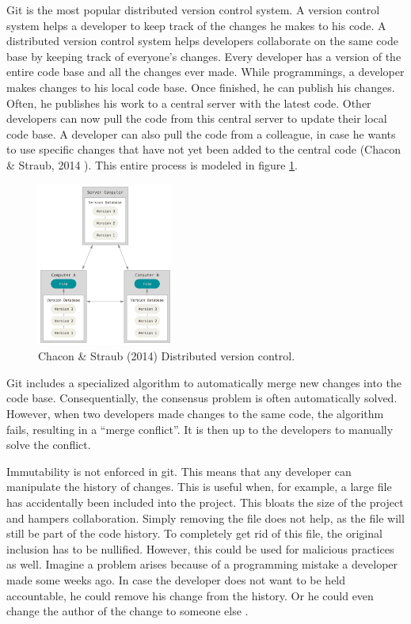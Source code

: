 Git is the most popular distributed version control system. A version control system helps a developer to keep track of the changes he makes to his code. A distributed version control system helps developers collaborate on the same code base by keeping track of everyone's changes. Every developer has a version of the entire code base and all the changes ever made. While programmings, a developer makes changes to his local code base. Once finished, he can publish his changes. Often, he publishes his work to a central server with the latest code. Other developers can now pull the code from this central server to update their local code base. A developer can also pull the code from a colleague, in case he wants to use specific changes that have not yet been added to the central code (Chacon \& Straub, 2014 \cite{git-manual-book}). This entire process is modeled in figure \ref{fig:distributed-vcs}.


\begin{figure}[h]
\centering
\includegraphics[width=0.4\textwidth]{paper-images/distributed.png}
\caption{Chacon \& Straub (2014) Distributed version control.} 
\label{fig:distributed-vcs}
\end{figure}

Git includes a specialized algorithm to automatically merge new changes into the code base. Consequentially, the consensus problem is often automatically solved. However, when two developers made changes to the same code, the algorithm fails, resulting in a ``merge conflict''. It is then up to the developers to manually solve the conflict. 

Immutability is not enforced in git. This means that any developer can manipulate the history of changes. This is useful when, for example, a large file has accidentally been included into the project. This bloats the size of the project and hampers collaboration. Simply removing the file does not help, as the file will still be part of the code history. To completely get rid of this file, the original inclusion has to be nullified. However, this could be used for malicious practices as well. Imagine a problem arises because of a programming mistake a developer made some weeks ago. In case the developer does not want to be held accountable, he could remove his change from the history. Or he could even change the author of the change to someone else \cite{change-author-commit}.

